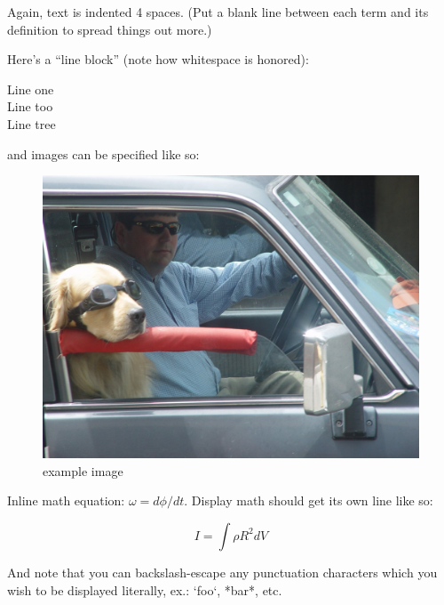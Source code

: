\documentclass[
  12pt,
  a4paper,
  oneside,tablecaptionabove
]{scrbook}
\begin{document}
Again, text is indented 4 spaces. (Put a blank line between each term
and its definition to spread things out more.)

Here's a ``line block'' (note how whitespace is honored):

Line one\\
\hspace*{0.333em}\hspace*{0.333em}Line too\\
Line tree

and images can be specified like so:

\begin{figure}
\centering
\includegraphics{example-image.jpg}
\caption{example image}
\end{figure}

Inline math equation: \(\omega = d\phi / dt\). Display math should get
its own line like so:

\[I = \int \rho R^{2} dV\]

And note that you can backslash-escape any punctuation characters which
you wish to be displayed literally, ex.: `foo`, *bar*, etc.



\printbibliography
\end{document}
